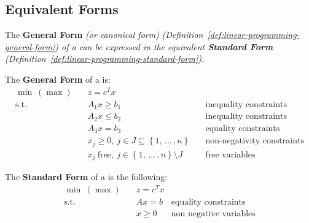 \documentclass[english]{article}
\begin{document}
\subsection{Equivalent Forms}

The \textbf{General Form} \textit{(or canonical form)} \textit{(Definition~\ref{def:linear-programming-general-form}) of a \LP can be expressed in the equivalent \textbf{Standard Form} (Definition~\ref{def:linear-programming-standard-form})}.

\begin{definition}
  \label{def:linear-programming-general-form}
  The \textbf{General Form} of a \LP is:
  \begin{align*}
    \min\ (\max) \quad & z = c^T x                                                                                                      \\
    \text{s.t.} \quad  & A_1 x \geq b_1 \quad                                                       & \text{inequality constraints}     \\
                       & A_2 x \leq b_2 \quad                                                       & \text{inequality constraints}     \\
                       & A_3 x = b_3 \quad                                                          & \text{equality constraints}       \\
                       & x_j \geq 0,\ j \in J \subseteq \left\{ 1, \, \ldots \,, n \right\} \quad   & \text{non-negativity constraints} \\
                       & x_j \ \text{free}, \ j \in \left\{ 1, \, \ldots \,, n \right\} \setminus J & \text{free variables}
  \end{align*}
\end{definition}

\begin{definition}
  \label{def:linear-programming-standard-form}
  The \textbf{Standard Form} of a \LP is the following:
  \begin{align*}
    \min\ (\max) \quad & z = c^T x &                               \\
    \text{s.t.} \quad  & Ax = b    & \text{equality constraints}   \\
                       & x \geq 0  & \text{non negative variables}
  \end{align*}
\end{definition}
\end{document}
